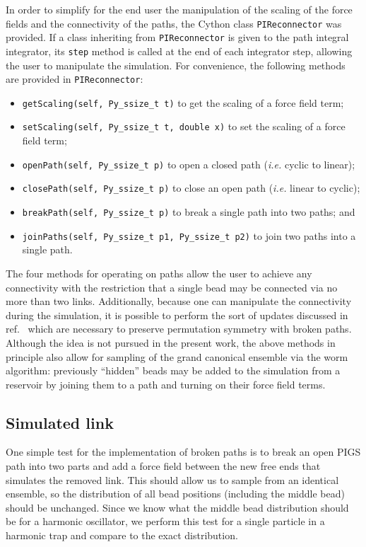 In order to simplify for the end user the manipulation of the scaling of the force fields and the connectivity of the paths, the Cython class \texttt{PIReconnector} was provided.
If a class inheriting from \texttt{PIReconnector} is given to the path integral integrator, its \texttt{step} method is called at the end of each integrator step, allowing the user to manipulate the simulation.
For convenience, the following methods are provided in \texttt{PIReconnector}:
\begin{itemize}
	\item \texttt{getScaling(self, Py\_ssize\_t t)} to get the scaling of a force field term;
	\item \texttt{setScaling(self, Py\_ssize\_t t, double x)} to set the scaling of a force field term;
	\item \texttt{openPath(self, Py\_ssize\_t p)} to open a closed path (\textit{i.e.} cyclic to linear);
	\item \texttt{closePath(self, Py\_ssize\_t p)} to close an open path (\textit{i.e.} linear to cyclic);
	\item \texttt{breakPath(self, Py\_ssize\_t p)} to break a single path into two paths; and
	\item \texttt{joinPaths(self, Py\_ssize\_t p1, Py\_ssize\_t p2)} to join two paths into a single path.
\end{itemize}
The four methods for operating on paths allow the user to achieve any connectivity with the restriction that a single bead may be connected via no more than two links.
Additionally, because one can manipulate the connectivity during the simulation, it is possible to perform the sort of updates discussed in ref.~\cite{herdman2014path} which are necessary to preserve permutation symmetry with broken paths.
Although the idea is not pursued in the present work, the above methods in principle also allow for sampling of the grand canonical ensemble via the worm algorithm: previously ``hidden'' beads may be added to the simulation from a reservoir by joining them to a path and turning on their force field terms.


\subsection{Simulated link}

\label{subsec:simulated-link}

One simple test for the implementation of broken paths is to break an open PIGS path into two parts and add a force field between the new free ends that simulates the removed link.
This should allow us to sample from an identical ensemble, so the distribution of all bead positions (including the middle bead) should be unchanged.
Since we know what the middle bead distribution should be for a harmonic oscillator, we perform this test for a single particle in a harmonic trap and compare to the exact distribution.

